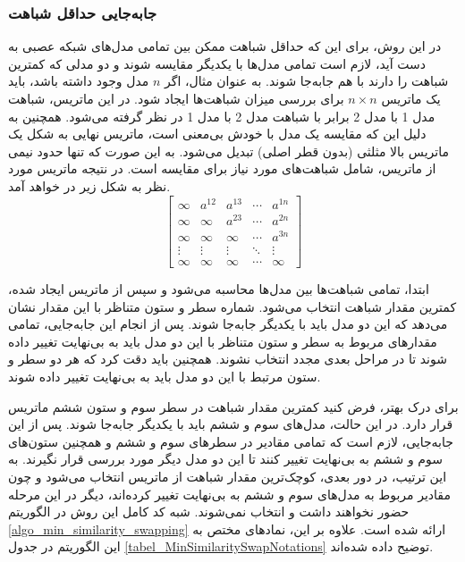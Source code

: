 \subsubsection{جابه‌جایی حداقل شباهت}

در این روش، برای این که حداقل شباهت ممکن بین تمامی مدل‌های شبکه عصبی به دست آید، لازم است تمامی مدل‌ها با یکدیگر مقایسه شوند و دو مدلی که کمترین شباهت را دارند با هم جابه‌جا شوند. به عنوان مثال، اگر \( n \) مدل وجود داشته باشد، باید یک ماتریس \( n \times n \) برای بررسی میزان شباهت‌ها ایجاد شود. در این ماتریس، شباهت مدل 1 با مدل 2 برابر با شباهت مدل 2 با مدل 1 در نظر گرفته می‌شود. همچنین به دلیل این که مقایسه یک مدل با خودش بی‌معنی است، ماتریس نهایی به شکل یک ماتریس بالا مثلثی%
(بدون قطر اصلی) تبدیل می‌شود. به این صورت که تنها حدود نیمی از ماتریس، شامل شباهت‌های مورد نیاز برای مقایسه است. در نتیجه ماتریس مورد نظر به شکل زیر در خواهد آمد.
\begin{equation}
	\begin{bmatrix}
		\infty & a^{12} & a^{13} & \cdots & a^{1n} \\
		\infty & \infty & a^{23} & \cdots & a^{2n} \\
		\infty & \infty & \infty & \cdots & a^{3n} \\
		\vdots & \vdots & \vdots & \ddots & \vdots \\
		\infty & \infty & \infty & \cdots & \infty
	\end{bmatrix}
	\label{eq_similarity_matrix}
\end{equation}

ابتدا، تمامی شباهت‌ها بین مدل‌ها محاسبه می‌شود و سپس از ماتریس ایجاد شده، کمترین مقدار شباهت انتخاب می‌شود. شماره سطر و ستون متناظر با این مقدار نشان می‌دهد که این دو مدل باید با یکدیگر جابه‌جا شوند. پس از انجام این جابه‌جایی، تمامی مقدارهای مربوط به سطر و ستون متناظر با این دو مدل باید به بی‌نهایت تغییر داده شوند تا در مراحل بعدی مجدد انتخاب نشوند. همچنین باید دقت کرد که هر دو سطر و ستون مرتبط با این دو مدل باید به بی‌نهایت تغییر داده شوند.

برای درک بهتر، فرض کنید کمترین مقدار شباهت در سطر سوم و ستون ششم ماتریس قرار دارد. در این حالت، مدل‌های سوم و ششم باید با یکدیگر جابه‌جا شوند. پس از این جابه‌جایی، لازم است که تمامی مقادیر در سطرهای سوم و ششم و همچنین ستون‌های سوم و ششم به بی‌نهایت تغییر کنند تا این دو مدل دیگر مورد بررسی قرار نگیرند. به این ترتیب، در دور بعدی، کوچک‌ترین مقدار شباهت از ماتریس انتخاب می‌شود و چون مقادیر مربوط به مدل‌های سوم و ششم به بی‌نهایت تغییر کرده‌اند، دیگر در این مرحله حضور نخواهند داشت و انتخاب نمی‌شوند. شبه کد کامل این روش در الگوریتم
\ref{algo_min_similarity_swapping}
ارائه شده است. علاوه بر این، نمادهای مختص به این الگوریتم در جدول
\ref{tabel_MinSimilaritySwapNotations}
توضیح داده شده‌اند.


